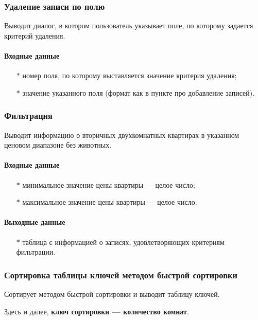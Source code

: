 \documentclass[a4paper,12pt]{extarticle}
\begin{document}
\subsubsection{Удаление записи по полю}
Выводит диалог, в котором пользователь указывает поле, по которому задается критерий удаления.

\paragraph{Входные данные}
\begin{itemize}
    \item[$*$] номер поля, по которому выставляется значение критерия удаления;
    \item[$*$] значение указанного поля (формат как в пункте про добавление записей).
\end{itemize}

\subsubsection{Фильтрация}
Выводит информацию о вторичных двухкомнатных квартирах в указанном ценовом диапазоне без животных.

\paragraph{Входные данные}
\begin{itemize}
    \item[$*$] минимальное значение цены квартиры --- целое число;
    \item[$*$] максимальное значение цены квартиры --- целое число.
\end{itemize}

\paragraph{Выходные данные}
\begin{itemize}
    \item[$*$] таблица с информацией о записях, удовлетворяющих критериям фильтрации.
\end{itemize}

\subsubsection{Сортировка таблицы ключей методом быстрой сортировки}
Сортирует методом быстрой сортировки и выводит таблицу ключей.

Здесь и далее, \textbf{ключ сортировки --- количество комнат}.
\end{document}
